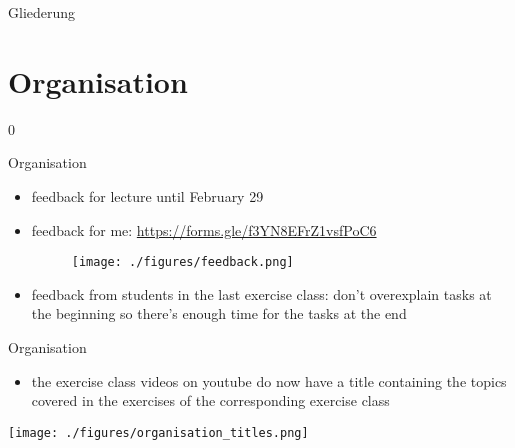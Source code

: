 \def\pascal{0}
\def\preview{1}









\begin{withoutheadline}
  \begin{withoutfootline}
    \begin{frame}
      \titlepagesecond
    \end{frame}
  \end{withoutfootline}

  \begin{frame}[shrink=10]{Gliederung}
    \tableofcontents[hideallsubsections]
  \end{frame}
\end{withoutheadline}

\setcounter{section}{-1}

\section{Organisation}

\if\pascal0{
  \begin{frame}{Organisation}
    \begin{itemize}
      \item \alert{feedback for lecture until February 29}
      \item \alert{feedback for me:} \url{https://forms.gle/f3YN8EFrZ1vsfPoC6}
      \begin{figure}
        \centering
        \texttt{[image: ./figures/feedback.png]}
      \end{figure}
      \item \alert{feedback from students in the last exercise class:} don't overexplain tasks at the beginning so there's enough time for the tasks at the end
    \end{itemize}
  \end{frame}
  \begin{frame}[allowframebreaks]{Organisation}
    \begin{itemize}
      \item the exercise class videos on youtube do now have a title containing the topics covered in the exercises of the corresponding exercise class
    \end{itemize}
    \texttt{[image: ./figures/organisation\_titles.png]}
  \end{frame}
}\fi


